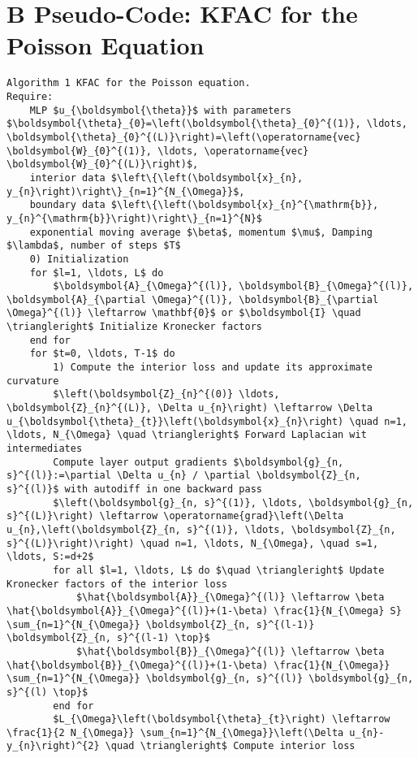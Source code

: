 \documentclass[10pt]{article}
\begin{document}
\section*{B Pseudo-Code: KFAC for the Poisson Equation}
\begin{verbatim}
Algorithm 1 KFAC for the Poisson equation.
Require:
    MLP $u_{\boldsymbol{\theta}}$ with parameters $\boldsymbol{\theta}_{0}=\left(\boldsymbol{\theta}_{0}^{(1)}, \ldots, \boldsymbol{\theta}_{0}^{(L)}\right)=\left(\operatorname{vec} \boldsymbol{W}_{0}^{(1)}, \ldots, \operatorname{vec} \boldsymbol{W}_{0}^{(L)}\right)$,
    interior data $\left\{\left(\boldsymbol{x}_{n}, y_{n}\right)\right\}_{n=1}^{N_{\Omega}}$,
    boundary data $\left\{\left(\boldsymbol{x}_{n}^{\mathrm{b}}, y_{n}^{\mathrm{b}}\right)\right\}_{n=1}^{N}$
    exponential moving average $\beta$, momentum $\mu$, Damping $\lambda$, number of steps $T$
    0) Initialization
    for $l=1, \ldots, L$ do
        $\boldsymbol{A}_{\Omega}^{(l)}, \boldsymbol{B}_{\Omega}^{(l)}, \boldsymbol{A}_{\partial \Omega}^{(l)}, \boldsymbol{B}_{\partial \Omega}^{(l)} \leftarrow \mathbf{0}$ or $\boldsymbol{I} \quad \triangleright$ Initialize Kronecker factors
    end for
    for $t=0, \ldots, T-1$ do
        1) Compute the interior loss and update its approximate curvature
        $\left(\boldsymbol{Z}_{n}^{(0)} \ldots, \boldsymbol{Z}_{n}^{(L)}, \Delta u_{n}\right) \leftarrow \Delta u_{\boldsymbol{\theta}_{t}}\left(\boldsymbol{x}_{n}\right) \quad n=1, \ldots, N_{\Omega} \quad \triangleright$ Forward Laplacian wit intermediates
        Compute layer output gradients $\boldsymbol{g}_{n, s}^{(l)}:=\partial \Delta u_{n} / \partial \boldsymbol{Z}_{n, s}^{(l)}$ with autodiff in one backward pass
        $\left(\boldsymbol{g}_{n, s}^{(1)}, \ldots, \boldsymbol{g}_{n, s}^{(L)}\right) \leftarrow \operatorname{grad}\left(\Delta u_{n},\left(\boldsymbol{Z}_{n, s}^{(1)}, \ldots, \boldsymbol{Z}_{n, s}^{(L)}\right)\right) \quad n=1, \ldots, N_{\Omega}, \quad s=1, \ldots, S:=d+2$
        for all $l=1, \ldots, L$ do $\quad \triangleright$ Update Kronecker factors of the interior loss
            $\hat{\boldsymbol{A}}_{\Omega}^{(l)} \leftarrow \beta \hat{\boldsymbol{A}}_{\Omega}^{(l)}+(1-\beta) \frac{1}{N_{\Omega} S} \sum_{n=1}^{N_{\Omega}} \boldsymbol{Z}_{n, s}^{(l-1)} \boldsymbol{Z}_{n, s}^{(l-1) \top}$
            $\hat{\boldsymbol{B}}_{\Omega}^{(l)} \leftarrow \beta \hat{\boldsymbol{B}}_{\Omega}^{(l)}+(1-\beta) \frac{1}{N_{\Omega}} \sum_{n=1}^{N_{\Omega}} \boldsymbol{g}_{n, s}^{(l)} \boldsymbol{g}_{n, s}^{(l) \top}$
        end for
        $L_{\Omega}\left(\boldsymbol{\theta}_{t}\right) \leftarrow \frac{1}{2 N_{\Omega}} \sum_{n=1}^{N_{\Omega}}\left(\Delta u_{n}-y_{n}\right)^{2} \quad \triangleright$ Compute interior loss

\end{verbatim}
\end{document}
